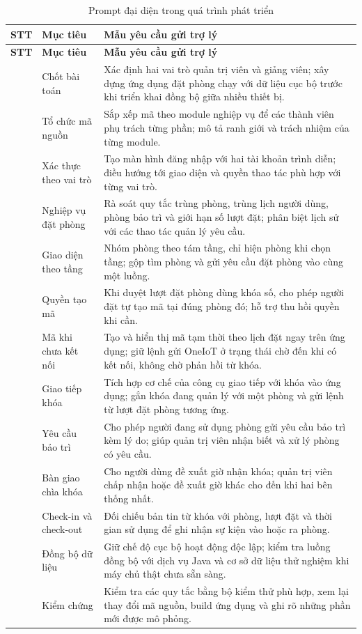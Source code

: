 \begin{longtable}{>{\centering\arraybackslash}p{1.0cm}>{\raggedright\arraybackslash}p{2.8cm}>{\raggedright\arraybackslash}p{9.8cm}}
\caption{Prompt đại diện trong quá trình phát triển}\label{tab:prompts}\\
\toprule
\rowcolor{RoomHubLight}
\textbf{STT} & \textbf{Mục tiêu} & \textbf{Mẫu yêu cầu gửi trợ lý} \\
\midrule
\endfirsthead
\toprule
\rowcolor{RoomHubLight}
\textbf{STT} & \textbf{Mục tiêu} & \textbf{Mẫu yêu cầu gửi trợ lý} \\
\midrule
\endhead
\bottomrule
\endfoot
1 & Chốt bài toán & Xác định hai vai trò quản trị viên và giảng viên; xây dựng ứng dụng đặt phòng chạy với dữ liệu cục bộ trước khi triển khai đồng bộ giữa nhiều thiết bị. \\
2 & Tổ chức mã nguồn & Sắp xếp mã theo module nghiệp vụ để các thành viên phụ trách từng phần; mô tả ranh giới và trách nhiệm của từng module. \\
3 & Xác thực theo vai trò & Tạo màn hình đăng nhập với hai tài khoản trình diễn; điều hướng tới giao diện và quyền thao tác phù hợp với từng vai trò. \\
4 & Nghiệp vụ đặt phòng & Rà soát quy tắc trùng phòng, trùng lịch người dùng, phòng bảo trì và giới hạn số lượt đặt; phân biệt lịch sử với các thao tác quản lý yêu cầu. \\
5 & Giao diện theo tầng & Nhóm phòng theo tám tầng, chỉ hiện phòng khi chọn tầng; gộp tìm phòng và gửi yêu cầu đặt phòng vào cùng một luồng. \\
6 & Quyền tạo mã & Khi duyệt lượt đặt phòng dùng khóa số, cho phép người đặt tự tạo mã tại đúng phòng đó; hỗ trợ thu hồi quyền khi cần. \\
7 & Mã khi chưa kết nối & Tạo và hiển thị mã tạm thời theo lịch đặt ngay trên ứng dụng; giữ lệnh gửi OneIoT ở trạng thái chờ đến khi có kết nối, không chờ phản hồi từ khóa. \\
8 & Giao tiếp khóa & Tích hợp cơ chế của công cụ giao tiếp với khóa vào ứng dụng; gắn khóa đang quản lý với một phòng và gửi lệnh từ lượt đặt phòng tương ứng. \\
9 & Yêu cầu bảo trì & Cho phép người đang sử dụng phòng gửi yêu cầu bảo trì kèm lý do; giúp quản trị viên nhận biết và xử lý phòng có yêu cầu. \\
10 & Bàn giao chìa khóa & Cho người dùng đề xuất giờ nhận khóa; quản trị viên chấp nhận hoặc đề xuất giờ khác cho đến khi hai bên thống nhất. \\
11 & Check-in và check-out & Đối chiếu bản tin từ khóa với phòng, lượt đặt và thời gian sử dụng để ghi nhận sự kiện vào hoặc ra phòng. \\
12 & Đồng bộ dữ liệu & Giữ chế độ cục bộ hoạt động độc lập; kiểm tra luồng đồng bộ với dịch vụ Java và cơ sở dữ liệu thử nghiệm khi máy chủ thật chưa sẵn sàng. \\
13 & Kiểm chứng & Kiểm tra các quy tắc bằng bộ kiểm thử phù hợp, xem lại thay đổi mã nguồn, build ứng dụng và ghi rõ những phần mới được mô phỏng. \\
\end{longtable}
